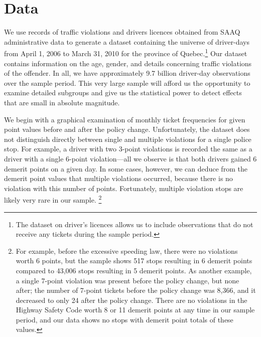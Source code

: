 \section{Data}
\label{sec:Data}


We use records of traffic violations and drivers licences obtained 
from SAAQ administrative data to generate a dataset containing 
the universe of driver-days from April 1, 2006 to March 31, 2010 
for the province of Quebec.\footnote{%
The dataset on driver’s licences allows us to include observations 
that do not receive any tickets during the sample period.}  
Our dataset contains information on the age, gender, 
and details concerning traffic violations of the offender. 
In all, we have approximately 9.7 billion driver-day observations 
over the sample period. 
This very large sample will afford us the opportunity to examine 
detailed subgroups and give us the statistical power 
to detect effects that are small in absolute magnitude.

We begin with a graphical examination of monthly ticket frequencies for given point values 
before and after the policy change. 
%
Unfortunately, the dataset does not distinguish directly 
between single and multiple violations for a single police stop. 
For example, a driver with two 3-point violations 
is recorded the same as 
a driver with a single 6-point violation---all we observe is that 
both drivers gained 6 demerit points on a given day. 
In some cases, however, we can deduce from the demerit point values 
that multiple violations occurred, because there is no violation with this number of points.
%
Fortunately, multiple violation stops are likely very rare in our sample.%
\footnote{%
For example, before the excessive speeding law, 
there were no violations worth 6 points, 
but the sample shows 517 stops resulting in 6 demerit points 
compared to 43,006 stops resulting in 5 demerit points. 
As another example, a single 7-point violation was present 
before the policy change, but none after; 
the number of 7-point tickets before the policy change was 8,366, 
and it decreased to only 24 after the policy change. 
There are no violations in the Highway Safety Code worth 8 or 11 demerit points 
at any time in our sample period, 
and our data shows no stops with demerit point totals of these values.}

